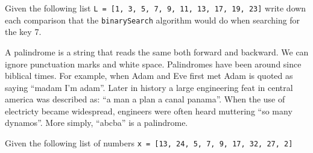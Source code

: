 \documentclass[11pt]{exam}
\begin{document}
\begin{questions}
\question[10] Given the following list \lstinline{L = [1, 3, 5, 7, 9, 11, 13, 17, 19, 23]} write down each comparison that the \texttt{binarySearch} algorithm would do when searching for the key 7.
\vspace{4in}

\question
A palindrome is a string that reads the same both forward and
backward. We can ignore punctuation marks and white space. Palindromes have been
 around since biblical times. For example, when Adam and Eve first met Adam is quoted as saying ``madam I'm adam''. Later in history a large engineering feat in central america was described as:
``a man a plan a canal panama''. When the use of electricty became widespread,
engineers were often heard muttering ``so many dynamos''.   More simply, ``abcba'' is a palindrome.

\newpage
\question Given the following list of numbers \lstinline{x = [13, 24, 5, 7, 9, 17, 32, 27, 2]}




\end{questions}
\end{document}
